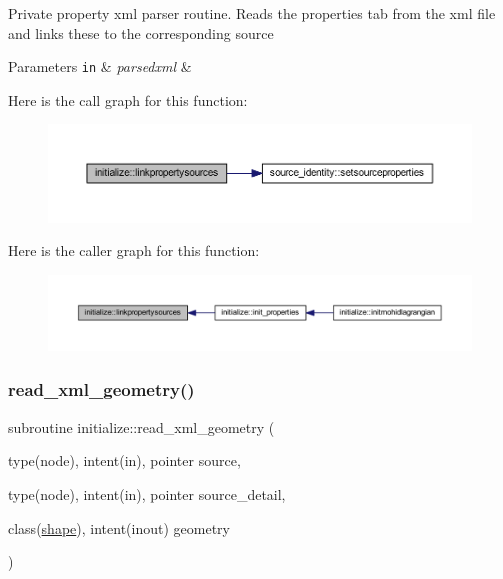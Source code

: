 Private property xml parser routine. Reads the properties tab from the xml file and links these to the corresponding source 
\begin{DoxyParams}[1]{Parameters}
\mbox{\tt in}  & {\em parsedxml} & \\
\hline
\end{DoxyParams}
Here is the call graph for this function\+:\nopagebreak
\begin{figure}[H]
\begin{center}
\leavevmode
\includegraphics[width=350pt]{namespaceinitialize_ab91b27efd537a161ee9ca4b2d9efde1a_cgraph}
\end{center}
\end{figure}
Here is the caller graph for this function\+:\nopagebreak
\begin{figure}[H]
\begin{center}
\leavevmode
\includegraphics[width=350pt]{namespaceinitialize_ab91b27efd537a161ee9ca4b2d9efde1a_icgraph}
\end{center}
\end{figure}
\mbox{\label{namespaceinitialize_ad36e4f602dab66c06a1f0e2474e9f0a6}} 
\subsubsection{\texorpdfstring{read\+\_\+xml\+\_\+geometry()}{read\_xml\_geometry()}}
{\footnotesize\ttfamily subroutine initialize\+::read\+\_\+xml\+\_\+geometry (\begin{DoxyParamCaption}\item[{type(node), intent(in), pointer}]{source,  }\item[{type(node), intent(in), pointer}]{source\+\_\+detail,  }\item[{class(\hyperlink{structgeometry_1_1shape}{shape}), intent(inout)}]{geometry }\end{DoxyParamCaption})\hspace{0.3cm}{\ttfamily [private]}}



